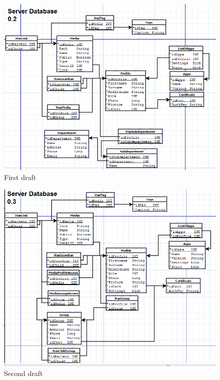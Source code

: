\begin{figure}[H]
	\centering
		\includegraphics[width=1.00\textwidth]{images/Databasedrafts/02.png}
	\caption{First draft}
	\label{fig:draft02}
\end{figure}

\begin{figure}[H]
	\centering
		\includegraphics[width=1.00\textwidth]{images/Databasedrafts/03.png}
	\caption{Second draft}
	\label{fig:draft03}
\end{figure}

